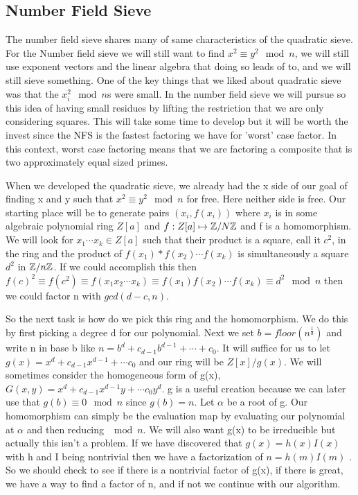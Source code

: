 \documentclass{article}
\begin{document}
\subsection{Number Field Sieve}
The number field sieve shares many of same characteristics of the quadratic sieve. For the Number field sieve we will still want to find $x^2 \equiv y^2 \mod n$, we will still use exponent vectors and the linear algebra that doing so leads of to, and we will still sieve something. One of the key things that we liked about quadratic sieve was that the $x_i^2 \mod n$s were small. In the number field sieve we will pursue so this idea of having small residues by lifting the restriction that we are only considering squares. This will take some time to develop but it will be worth the invest since the NFS is the fastest factoring we have for 'worst' case factor. In this context,  worst case factoring means that we are factoring a composite that is two approximately equal sized primes. 

When we developed the quadratic sieve, we already had the x side of our goal of finding x and y such that $x^2 \equiv y^2 \mod n$ for free. Here neither side is free. Our starting place will be to generate pairs $(x_i, f(x_i))$ where $x_i$ is in some algebraic polynomial ring $Z[a]$ and $f : Z[a] \mapsto \mathbb{Z} / N \mathbb{Z} $ and f is a homomorphism. We will look for $x_1 \cdots x_k \in Z[a]$ such that their product is a square, call it $c^2$, in the ring and the product of $f(x_1) * f(x_2) \cdots f(x_k)$ is simultaneously a square $d^2$  in $\mathbb{Z} / n \mathbb{Z}$. If we could accomplish this then $f(c)^2 \equiv f(c^2 ) \equiv f(x_1 x_2 \cdots x_k) \equiv f(x_1) f(x_2) \cdots f(x_k) \equiv d^2 \mod n $ then we could factor n with $gcd(d - c,  n)$. 

So the next task is how do we pick this ring and the homomorphism. We do this by first picking a degree d for our polynomial. Next we set $b = floor( n^{\frac{1}{d}} )$ and write n in base b like $n = b^d + c_{d-1} b^{d-1} + \cdots + c_0$. It will suffice for us to let $g(x) = x^d + c_{d-1} x^{d-1} + \cdots c_0$ and our ring will be $Z[x]/g(x)$. We will sometimes consider the homogeneous form of g(x), $G(x,y) = x^d + c_{d-1} x^{d-1} y + \cdots c_0 y^d$.  g is a useful creation because we can later use that $g(b) \equiv 0 \mod n$ since $g(b) = n$.  Let $\alpha$ be a root of g. Our homomorphism can simply be the evaluation map by evaluating our polynomial at $\alpha$ and then reducing $\mod n$. We will also want g(x) to be irreducible but actually this isn't a problem. If we have discovered that $g(x) = h(x) I(x)$ with h and I being nontrivial then we have a factorization of $n = h(m) I(m)$ \cite{brillhart1988factorizations}. So we should check to see if there is a nontrivial factor of g(x), if there is great, we have a way to find a factor of n, and if not we continue with our algorithm. 
\end{document}
